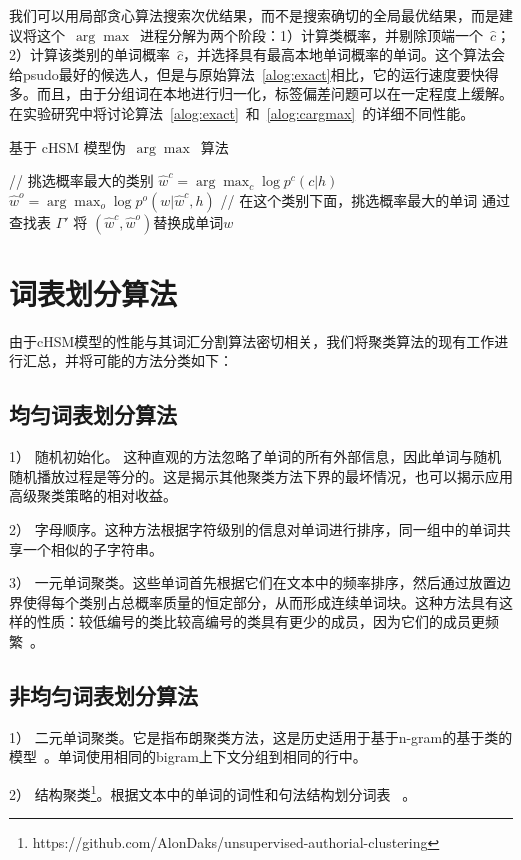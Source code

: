 我们可以用局部贪心算法搜索次优结果，而不是搜索确切的全局最优结果，而是建议将这个~$\arg\max$~进程分解为两个阶段：1）计算类概率，并剔除顶端一个~$\hat c$； 2）计算该类别的单词概率~$\hat c$，并选择具有最高本地单词概率的单词。这个算法会给psudo最好的候选人，但是与原始算法~\ref{alog:exact}相比，它的运行速度要快得多。而且，由于分组词在本地进行归一化，标签偏差问题可以在一定程度上缓解。在实验研究中将讨论算法~\ref{alog:exact}~和~\ref{alog:cargmax}~的详细不同性能。
\begin{algorithm}[!t]
 \caption{基于 cHSM 模型伪~$\arg\max$~算法}\label{alog:cargmax}
{// 挑选概率最大的类别}\;
 {$\hat w^c=\arg\max_c{\log p^c(c|h)}$ }\;
 {$\hat w^o=\arg\max_o{\log p^o(w|\hat w^c,h)}$}\;
 {// 在这个类别下面，挑选概率最大的单词}\;
 {通过查找表 $\Gamma'$ 将 $(\hat w^c,\hat w^o)$替换成单词$w$}\;
\end{algorithm}

\section{词表划分算法}
由于cHSM模型的性能与其词汇分割算法密切相关，我们将聚类算法的现有工作进行汇总，并将可能的方法分类如下：

\subsection{均匀词表划分算法}
1） 随机初始化。 这种直观的方法忽略了单词的所有外部信息，因此单词与随机随机播放过程是等分的。这是揭示其他聚类方法下界的最坏情况，也可以揭示应用高级聚类策略的相对收益。

2） 字母顺序。这种方法根据字符级别的信息对单词进行排序，同一组中的单词共享一个相似的子字符串。

3） 一元单词聚类。这些单词首先根据它们在文本中的频率排序，然后通过放置边界使得每个类别占总概率质量的恒定部分，从而形成连续单词块。这种方法具有这样的性质：较低编号的类比较高编号的类具有更少的成员，因为它们的成员更频繁~。


\subsection{非均匀词表划分算法}
1） 二元单词聚类。它是指布朗聚类方法，这是历史适用于基于n-gram的基于类的模型~。单词使用相同的bigram上下文分组到相同的行中。

2） 结构聚类\footnote{https://github.com/AlonDaks/unsupervised-authorial-clustering}。根据文本中的单词的词性和句法结构划分词表~ 。

